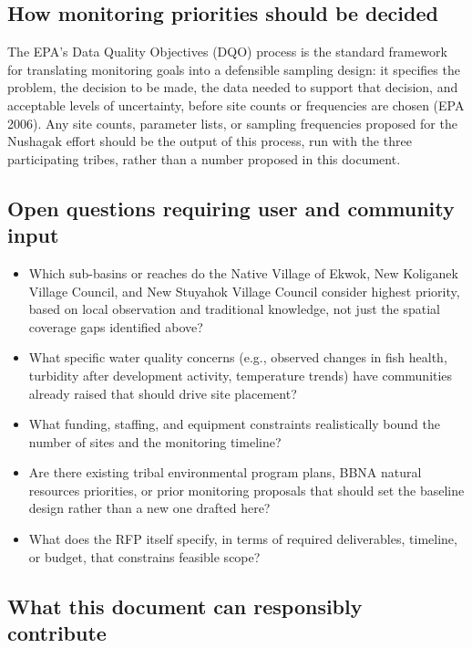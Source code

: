 \documentclass[
  letterpaper,
]{scrbook}
\providecommand{\tightlist}{%
  \setlength{\itemsep}{0pt}\setlength{\parskip}{0pt}}\usepackage{longtable,booktabs,array}
\begin{document}
\subsection{How monitoring priorities should be
decided}\label{how-monitoring-priorities-should-be-decided}

The EPA's Data Quality Objectives (DQO) process is the standard
framework for translating monitoring goals into a defensible sampling
design: it specifies the problem, the decision to be made, the data
needed to support that decision, and acceptable levels of uncertainty,
before site counts or frequencies are chosen (EPA 2006). Any site
counts, parameter lists, or sampling frequencies proposed for the
Nushagak effort should be the output of this process, run with the three
participating tribes, rather than a number proposed in this document.

\subsection{Open questions requiring user and community
input}\label{open-questions-requiring-user-and-community-input}

\begin{itemize}
\tightlist
\item
  Which sub-basins or reaches do the Native Village of Ekwok, New
  Koliganek Village Council, and New Stuyahok Village Council consider
  highest priority, based on local observation and traditional
  knowledge, not just the spatial coverage gaps identified above?
\item
  What specific water quality concerns (e.g., observed changes in fish
  health, turbidity after development activity, temperature trends) have
  communities already raised that should drive site placement?
\item
  What funding, staffing, and equipment constraints realistically bound
  the number of sites and the monitoring timeline?
\item
  Are there existing tribal environmental program plans, BBNA natural
  resources priorities, or prior monitoring proposals that should set
  the baseline design rather than a new one drafted here?
\item
  What does the RFP itself specify, in terms of required deliverables,
  timeline, or budget, that constrains feasible scope?
\end{itemize}

\subsection{What this document can responsibly
contribute}\label{what-this-document-can-responsibly-contribute}
\end{document}
